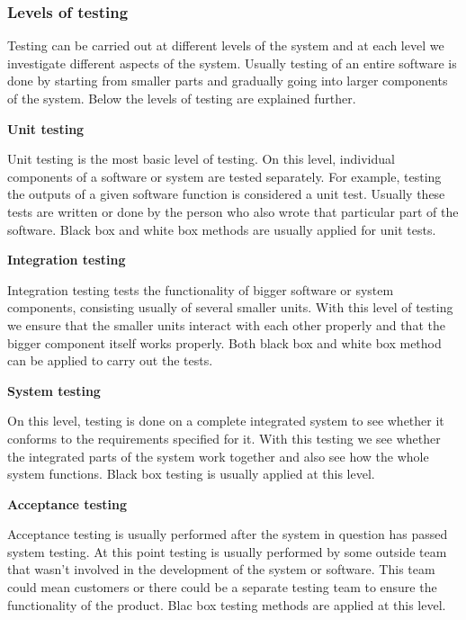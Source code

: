 \documentclass[english,12pt,a4paper,pdftex,elec,utf8]{aaltothesis}
\begin{document}
\subsubsection{Levels of testing}
Testing can be carried out at different levels of the system and at each level we investigate different aspects of the system. Usually testing of an entire software is done by starting from smaller parts and gradually going into larger components of the system. \cite{sularikurssi, testingcomplex}
Below the levels of testing are explained further.\par 
\textbf{Unit testing}\par 
Unit testing is the most basic level of testing. On this level, individual components of a software or system are tested separately. For example, testing the outputs of a given software function is considered a unit test. Usually these tests are written or done by the person who also wrote that particular part of the software. Black box and white box methods are usually applied for unit tests. \cite{sularikurssi}\par
\textbf{Integration testing}\par 
Integration testing tests the functionality of bigger software or system components, consisting usually of several smaller units. With this level of testing we ensure that the smaller units interact with each other properly and that the bigger component itself works properly. Both black box and white box method can be applied to carry out the tests. \cite{sularikurssi}\par
\textbf{System testing}\par 
On this level, testing is done on a complete integrated system to see whether it conforms to the requirements specified for it. With this testing we see whether the integrated parts of the system work together and also see how the whole system functions. Black box testing is usually applied at this level. \cite{sularikurssi}\par
\textbf{Acceptance testing}\par 
Acceptance testing is usually performed after the system in question has passed system testing. At this point testing is usually performed by some outside team that wasn't involved in the development of the system or software. This team could mean customers or there could be a separate testing team to ensure the functionality of the product. Blac box testing methods are applied at this level.\par
\end{document}
